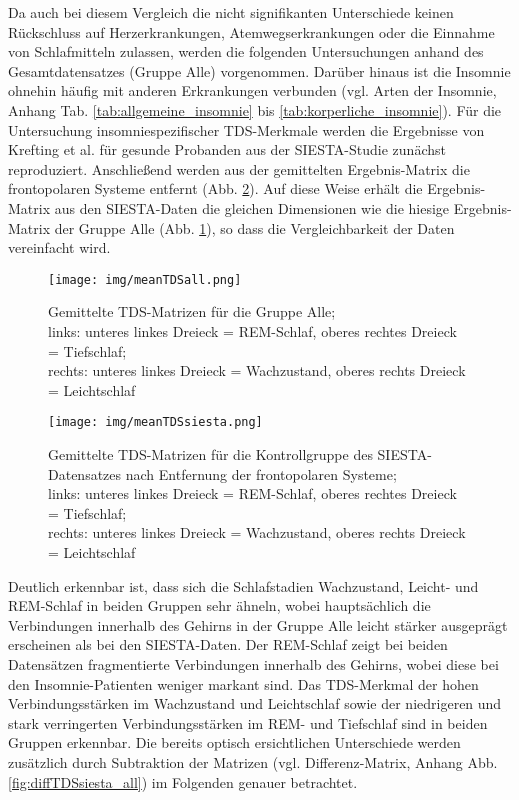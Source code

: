 Da auch bei diesem Vergleich die nicht signifikanten Unterschiede keinen Rückschluss auf Herzerkrankungen, Atemwegserkrankungen oder die Einnahme von Schlafmitteln zulassen, werden die folgenden Untersuchungen anhand des Gesamtdatensatzes (Gruppe Alle) vorgenommen. Darüber hinaus ist die Insomnie ohnehin häufig mit anderen Erkrankungen verbunden (vgl. Arten der Insomnie, Anhang Tab. \ref{tab:allgemeine_insomnie} bis \ref{tab:korperliche_insomnie}). Für die Untersuchung insomniespezifischer \acs{TDS}-Merkmale werden die Ergebnisse von Krefting et al. \parencite{krefting_age_2017} für gesunde Probanden aus der SIESTA-Studie \parencite{klosch_siesta_2001} zunächst reproduziert. Anschließend werden aus der gemittelten Ergebnis-Matrix die frontopolaren Systeme entfernt (Abb. \ref{fig:meanTDSsiesta}). Auf diese Weise erhält die Ergebnis-Matrix aus den SIESTA-Daten die gleichen Dimensionen wie die hiesige Ergebnis-Matrix der Gruppe Alle (Abb. \ref{fig:meanTDSall}), so dass die Vergleichbarkeit der Daten vereinfacht wird.\\

\begin{figure}[H]
	\centering
	\texttt{[image: img/meanTDSall.png]}
	\caption[\acs{TDS}-Gruppenergebnis für die Gruppe Alle]{Gemittelte \acs{TDS}-Matrizen für die Gruppe Alle;\\links: unteres linkes Dreieck = \acs{REM}-Schlaf, oberes rechtes Dreieck = Tiefschlaf;\\rechts: unteres linkes Dreieck = Wachzustand, oberes rechts Dreieck = Leichtschlaf}
	\label{fig:meanTDSall}
\end{figure}

\begin{figure}[H]
	\centering
	\texttt{[image: img/meanTDSsiesta.png]}
	\caption[\acs{TDS}-Gruppenergebnis für den SIESTA-Datensatz]{Gemittelte \acs{TDS}-Matrizen für die Kontrollgruppe des SIESTA-Datensatzes nach Entfernung der frontopolaren Systeme;\\links: unteres linkes Dreieck = \acs{REM}-Schlaf, oberes rechtes Dreieck = Tiefschlaf;\\rechts: unteres linkes Dreieck = Wachzustand, oberes rechts Dreieck = Leichtschlaf}
	\label{fig:meanTDSsiesta}
\end{figure}

\newpage

Deutlich erkennbar ist, dass sich die Schlafstadien Wachzustand, Leicht- und \acs{REM}-Schlaf in beiden Gruppen sehr ähneln, wobei hauptsächlich die Verbindungen innerhalb des Gehirns in der Gruppe Alle leicht stärker ausgeprägt erscheinen als bei den SIESTA-Daten. Der \acs{REM}-Schlaf zeigt bei beiden Datensätzen fragmentierte Verbindungen innerhalb des Gehirns, wobei diese bei den Insomnie-Patienten weniger markant sind. Das \acs{TDS}-Merkmal der hohen Verbindungsstärken im Wachzustand und Leichtschlaf sowie der niedrigeren und stark verringerten Verbindungsstärken im \acs{REM}- und Tiefschlaf sind in beiden Gruppen erkennbar. Die bereits optisch ersichtlichen Unterschiede werden zusätzlich durch Subtraktion der Matrizen (vgl. Differenz-Matrix, Anhang Abb. \ref{fig:diffTDSsiesta_all}) im Folgenden genauer betrachtet.

